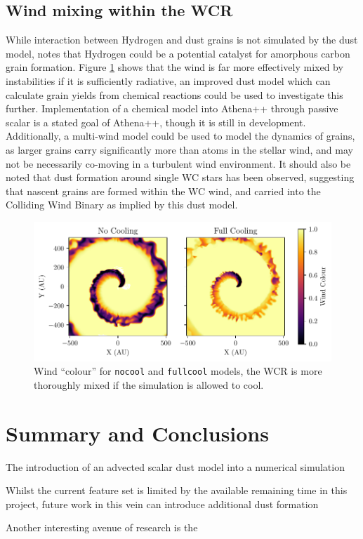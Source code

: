 \subsection{Wind mixing within the WCR}


While interaction between Hydrogen and dust grains is not simulated by the dust model, \textcite{leteuffModelDustFormation2002} notes that Hydrogen could be a potential catalyst for amorphous carbon grain formation.
Figure \ref{fig:radiative-windmixing} shows that the wind is far more effectively mixed by instabilities if it is sufficiently radiative, an improved dust model which can calculate grain yields from chemical reactions could be used to investigate this further.
Implementation of a chemical model into Athena++ through passive scalar is a stated goal of Athena++, though it is still in development.
Additionally, a multi-wind model could be used to model the dynamics of grains, as larger grains carry significantly more than atoms in the stellar wind, and may not be necessarily co-moving in a turbulent wind environment.
It should also be noted that dust formation around single WC stars has been observed, suggesting that nascent grains are formed within the WC wind, and carried into the Colliding Wind Binary as implied by this dust model.

\begin{figure}
  \centering
  \includegraphics{assets/results/radiative/radiative-r0.pdf}
  \caption[Wind mixing due to radiative methods]{Wind ``colour'' for \texttt{nocool} and \texttt{fullcool} models, the WCR is more thoroughly mixed if the simulation is allowed to cool.}
  \label{fig:radiative-windmixing}
\end{figure}

\section{Summary and Conclusions}

The introduction of an advected scalar dust model into a numerical simulation

Whilst the current feature set is limited by the available remaining time in this project, future work in this vein can introduce additional dust formation

Another interesting avenue of research is the 